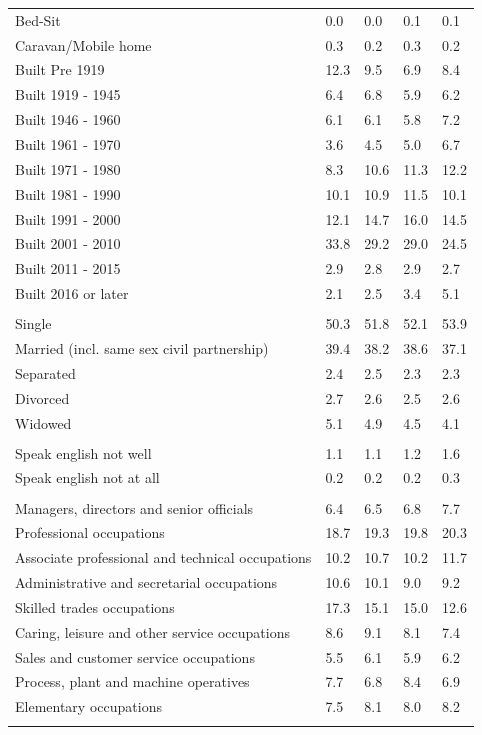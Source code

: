 \documentclass{article}
\begin{document}
\begin{table}[h]
\begin{tabular}{KTTTT}
Bed-Sit & 0.0& 0.0& 0.1& 0.1\\
Caravan/Mobile home & 0.3& 0.2& 0.3& 0.2\\
    \hline
Built Pre 1919 & 12.3&  9.5&  6.9&  8.4\\
Built 1919 - 1945 & 6.4& 6.8& 5.9& 6.2\\
Built  1946 - 1960 & 6.1& 6.1& 5.8& 7.2\\
Built  1961 - 1970 & 3.6& 4.5& 5.0& 6.7\\
Built  1971 - 1980 &  8.3& 10.6& 11.3& 12.2\\
Built  1981 - 1990 & 10.1& 10.9& 11.5& 10.1\\
Built  1991 - 2000 & 12.1& 14.7& 16.0& 14.5\\
Built  2001 - 2010 & 33.8& 29.2& 29.0& 24.5\\
Built  2011 - 2015 & 2.9& 2.8& 2.9& 2.7\\
Built  2016 or later & 2.1& 2.5& 3.4& 5.1\\
\hline
    \\
    \hline
Single & 50.3& 51.8& 52.1& 53.9\\
Married (incl. same sex civil partnership) & 39.4& 38.2& 38.6& 37.1\\
Separated  & 2.4& 2.5& 2.3& 2.3\\
Divorced  & 2.7& 2.6& 2.5& 2.6\\
Widowed & 5.1& 4.9& 4.5& 4.1\\
\hline
    \\ 
    \hline
Speak english not well & 1.1& 1.1& 1.2& 1.6\\
Speak english not at all & 0.2& 0.2& 0.2& 0.3\\
\hline
    \\
    \hline
Managers, directors and senior officials & 6.4& 6.5& 6.8& 7.7\\
Professional occupations & 18.7& 19.3& 19.8& 20.3\\
Associate professional and technical occupations & 10.2& 10.7& 10.2& 11.7\\
Administrative and secretarial occupations & 10.6& 10.1&  9.0&  9.2\\
Skilled trades occupations & 17.3& 15.1& 15.0& 12.6\\
Caring, leisure and other service occupations & 8.6& 9.1& 8.1& 7.4\\
Sales and customer service occupations & 5.5& 6.1& 5.9& 6.2\\
Process, plant and machine operatives & 7.7& 6.8& 8.4& 6.9\\
Elementary occupations & 7.5& 8.1& 8.0& 8.2\\
\hline
\end{tabular}
\end{table}
\end{document}

